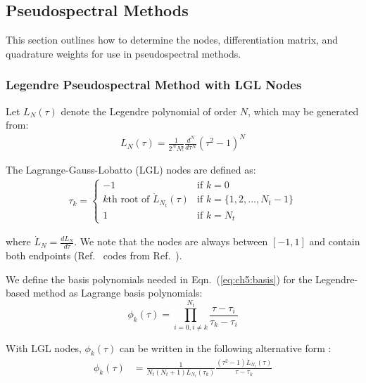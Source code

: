\subsection{Pseudospectral Methods\label{sec:app3:ps}}

This section outlines how to determine the nodes, differentiation matrix, and quadrature weights for use in pseudospectral methods.

\subsubsection{Legendre Pseudospectral Method with LGL Nodes\label{sec:app3:sLGL}}

Let $L_N(\tau)$ denote the Legendre polynomial of order $N$, which may be generated from:
\begin{align}
L_N(\tau) = \frac{1}{2^N N!} \frac{d^N}{d\tau^N}\left(\tau^2 - 1 \right)^N
\end{align}

\noindent The Lagrange-Gauss-Lobatto (LGL) nodes are defined as:
\begin{align}
\tau_k = \begin{cases} -1 & \text{if } k = 0 \\
k\text{th root of } \dot{L}_{N_t}(\tau) & \text{if } k = \{1,2,\dots,N_t-1\} \\
 1 & \text{if } k = N_t 
\end{cases}
\end{align}

\noindent where $\dot{L}_{N} = \frac{dL_{N}}{d\tau}$. We note that the nodes are always between $\left[-1,1\right]$ and contain both endpoints (Ref.~\cite{github-basic-multiple-interval-pseudospectral} codes from Ref.~\cite{Shen2011a}).

We define the basis polynomials needed in Eqn.~(\ref{eq:ch5:basis}) for the Legendre-based method as Lagrange basis polynomials:
\begin{equation}
\phi_k(\tau) = \prod_{i=0,i\neq k}^{N_t} \frac{\tau - \tau_i}{\tau_k - \tau_i} \label{eq:lagrangepoly}
\end{equation}

\noindent With LGL nodes, $\phi_k(\tau)$ can be written in the following alternative form \cite{Becerra2010b}:
\begin{align}
\phi_k(\tau) &= \frac{1}{N_t\left(N_t + 1\right) L_{N_t}(\tau_k)} \frac{(\tau^2 - 1) \ensuremath{\dot{L}}_{N_t}(\tau)}{\tau-\tau_k}
\end{align}


